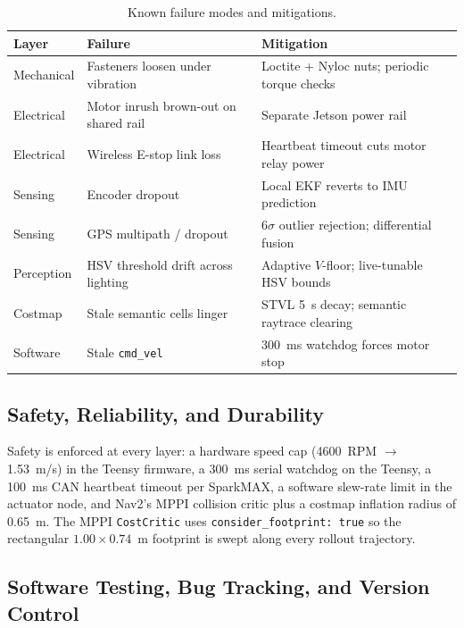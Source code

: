 \documentclass[12pt, letterpaper]{article}
\begin{document}
\begin{table}[H]
    \centering
    \small
    \caption{Known failure modes and mitigations.}
    \begin{tabularx}{\textwidth}{l X X}
        \toprule
        \textbf{Layer} & \textbf{Failure} & \textbf{Mitigation} \\
        \midrule
        Mechanical & Fasteners loosen under vibration & Loctite + Nyloc nuts; periodic torque checks \\
        Electrical & Motor inrush brown-out on shared rail & Separate Jetson power rail \\
        Electrical & Wireless E-stop link loss & Heartbeat timeout cuts motor relay power \\
        Sensing & Encoder dropout & Local EKF reverts to IMU prediction \\
        Sensing & GPS multipath / dropout & 6$\sigma$ outlier rejection; differential fusion \\
        Perception & HSV threshold drift across lighting & Adaptive $V$-floor; live-tunable HSV bounds \\
        Costmap & Stale semantic cells linger & STVL 5~s decay; semantic raytrace clearing \\
        Software & Stale \texttt{cmd\_vel} & 300~ms watchdog forces motor stop \\
        \bottomrule
    \end{tabularx}
\end{table}

\subsection{Safety, Reliability, and Durability}

Safety is enforced at every layer: a hardware speed cap (4600~RPM $\to$ 1.53~m/s) in the
Teensy firmware, a 300~ms serial watchdog on the Teensy, a 100~ms CAN heartbeat timeout
per SparkMAX, a software slew-rate limit in the actuator node, and Nav2's MPPI collision
critic plus a costmap inflation radius of 0.65~m. The MPPI \texttt{CostCritic} uses
\texttt{consider\_footprint: true} so the rectangular $1.00 \times 0.74$~m footprint is
swept along every rollout trajectory.

\subsection{Software Testing, Bug Tracking, and Version Control}
\end{document}
